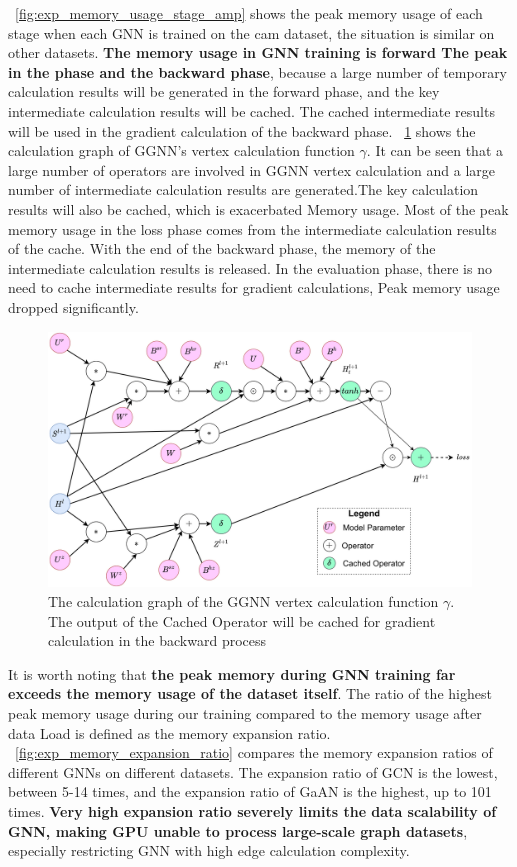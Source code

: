 \figurename~\ref{fig:exp_memory_usage_stage_amp} shows the peak memory usage of each stage when each GNN is trained on the cam dataset, the situation is similar on other datasets.
\textbf{The memory usage in GNN training is forward The peak in the phase and the backward phase},
because a large number of temporary calculation results will be generated in the forward phase,
and the key intermediate calculation results will be cached.
The cached intermediate results will be used in the gradient calculation of the backward phase.
\figurename~\ref{fig:ggnn_vertex_func_computation_graph} shows the calculation graph of GGNN's vertex calculation function $\gamma$.
It can be seen that a large number of operators are involved in GGNN vertex calculation and a large number of intermediate calculation results are generated.The key calculation results will also be cached,
which is exacerbated Memory usage. Most of the peak memory usage in the loss phase comes from the intermediate calculation results of the cache.
With the end of the backward phase, the memory of the intermediate calculation results is released.
In the evaluation phase, there is no need to cache intermediate results for gradient calculations, Peak memory usage dropped significantly.

\begin{figure}
    \centering
    \includegraphics[width=0.7\columnwidth]{figs/illustration/ggnn_vertex_func_computation_graph.png}
    \caption{The calculation graph of the GGNN vertex calculation function $\gamma$. The output of the Cached Operator will be cached for gradient calculation in the backward process}
    \label{fig:ggnn_vertex_func_computation_graph}
\end{figure}

It is worth noting that \textbf{the peak memory during GNN training far exceeds the memory usage of the dataset itself}.
The ratio of the highest peak memory usage during our training compared to the memory usage after data Load is
defined as the memory expansion ratio. \figurename~\ref{fig:exp_memory_expansion_ratio} compares the memory expansion ratios
of different GNNs on different datasets. The expansion ratio of GCN is the lowest, between 5-14 times,
and the expansion ratio of GaAN is the highest, up to 101 times.
\textbf{Very high expansion ratio severely limits the data scalability of GNN, making GPU unable to process large-scale graph datasets},
especially restricting GNN with high edge calculation complexity.


